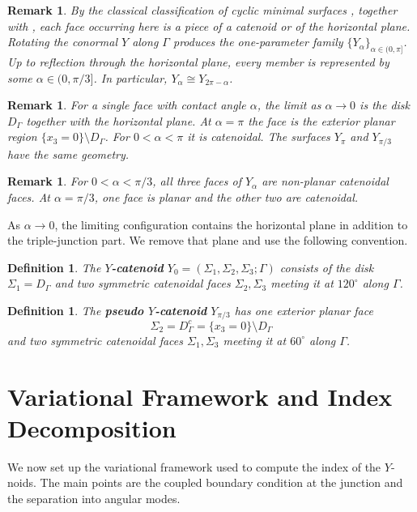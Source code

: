 \documentclass[11pt,twoside]{amsart}
\newtheorem{defn}[thm]{Definition}
\newtheorem{rem}[thm]{\bf{Remark}}
\numberwithin{equation}{section}
\begin{document}
\begin{rem} \label{rem: Y-alphas}
\rm
By the classical classification of cyclic minimal surfaces \cite{riemann1867flache,enneper1869cyklischen,nitsche1989lectures}, together with \cite{pyo2012remarks}, each face occurring here is a piece of a catenoid or of the horizontal plane. Rotating the conormal $Y$ along $\Gamma$ produces the one-parameter family $\{Y_\alpha\}_{\alpha\in(0,\pi]}$. Up to reflection through the horizontal plane, every member is represented by some $\alpha\in(0,\pi/3]$. In particular, $Y_\alpha\cong Y_{2\pi-\alpha}$.
\end{rem}

\begin{rem}
\rm
For a single face with contact angle $\alpha$, the limit as $\alpha\to0$ is the disk $D_\Gamma$ together with the horizontal plane. At $\alpha=\pi$ the face is the exterior planar region $\{x_3=0\}\setminus D_\Gamma$. For $0<\alpha<\pi$ it is catenoidal. The surfaces $Y_\pi$ and $Y_{\pi/3}$ have the same geometry.
\end{rem}

\begin{rem}
\rm
For $0<\alpha<\pi/3$, all three faces of $Y_\alpha$ are non-planar catenoidal faces. At $\alpha=\pi/3$, one face is planar and the other two are catenoidal.
\end{rem}

As $\alpha\to0$, the limiting configuration contains the horizontal plane in addition to the triple-junction part. We remove that plane and use the following convention.

\begin{defn} \label{def: y-catenoid}
\rm
The \textbf{$Y$-catenoid} $Y_0=(\Sigma_1,\Sigma_2,\Sigma_3;\Gamma)$ consists of the disk $\Sigma_1=D_\Gamma$ and two symmetric catenoidal faces $\Sigma_2,\Sigma_3$ meeting it at $120^\circ$ along $\Gamma$.
\end{defn}

\begin{defn} \label{def: pseudo y-catenoid}
\rm
The \textbf{pseudo $Y$-catenoid} $Y_{\pi/3}$ has one exterior planar face
\[
\Sigma_2=D_\Gamma^c=\{x_3=0\}\setminus D_\Gamma
\]
and two symmetric catenoidal faces $\Sigma_1,\Sigma_3$ meeting it at $60^\circ$ along $\Gamma$.
\end{defn}

\section{Variational Framework and Index Decomposition} \label{sec: index evaluation on catenoidal}
We now set up the variational framework used to compute the index of the $Y$-noids. The main points are the coupled boundary condition at the junction and the separation into angular modes.
\end{document}
